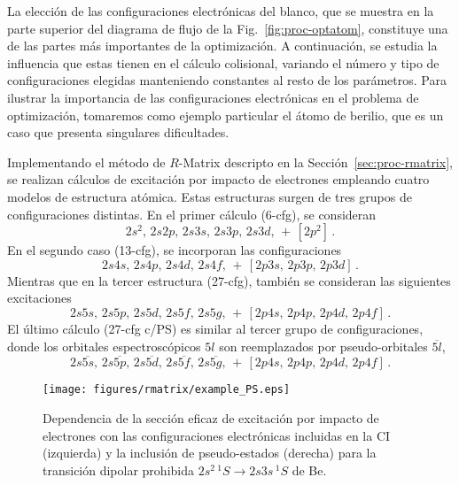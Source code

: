 La elección de las configuraciones electrónicas del blanco, que se 
muestra en la parte superior del diagrama de flujo de la 
Fig.~\ref{fig:proc-optatom}, constituye una de las partes más 
importantes de la optimización. A continuación, se estudia la influencia 
que estas tienen en el cálculo colisional, variando el número y tipo de 
configuraciones elegidas manteniendo constantes al resto de los 
parámetros. Para ilustrar la importancia de las configuraciones 
electrónicas en el problema de optimización, tomaremos como ejemplo 
particular el átomo de berilio, que es un caso que presenta singulares 
dificultades. 

Implementando el método de $R$-Matrix descripto en la 
Sección~\ref{sec:proc-rmatrix}, se realizan cálculos de excitación por 
impacto de electrones empleando cuatro modelos de estructura atómica. 
Estas estructuras surgen de tres grupos de configuraciones distintas. En 
el primer cálculo (6-cfg), se consideran  
\begin{equation}
2s^2,\,2s2p,\,2s3s,\,2s3p,\,2s3d,\,+\,
\left[2p^2\right]\,.
\label{eq:cfgA}
\end{equation} 
En el segundo caso (13-cfg), se incorporan las configuraciones 
\begin{equation}
2s4s,\,2s4p,\,2s4d,\,2s4f,\,+\,
\left[2p3s,\,2p3p,\,2p3d\right]\,.
\label{eq:cfgB}
\end{equation} 
Mientras que en la tercer estructura (27-cfg), también se consideran las 
siguientes excitaciones 
\begin{equation}
2s5s,\,2s5p,\,2s5d,\,2s5f,\,2s5g,\,+\,
\left[2p4s,\,2p4p,\,2p4d,\,2p4f\right]\,.
\label{eq:cfgC}
\end{equation} 
El último cálculo (27-cfg c/PS) es similar al tercer grupo de 
configuraciones, donde los orbitales espectroscópicos $5l$ son 
reemplazados por pseudo-orbitales $\overline{5l}$,
\begin{equation}
2s\overline{5s},\,2s\overline{5p},\,2s\overline{5d},\,2s\overline{5f},\,
2s\overline{5g},\,+\,
\left[2p4s,\,2p4p,\,2p4d,\,2p4f\right]\,.
\label{eq:cfgD}
\end{equation} 

\begin{figure}[t]
\centering
\texttt{[image: figures/rmatrix/example\_PS.eps]}
\caption[Dependencia de la sección eficaz de excitación con las 
configuraciones electrónicas y los pseudo-estados.]
{Dependencia de la sección eficaz de excitación por impacto de
electrones con las configuraciones electrónicas incluidas en la CI 
(izquierda) y la inclusión de pseudo-estados (derecha) para la transición 
dipolar prohibida $2s^2\,^1S \rightarrow 2s3s\,^1S$ de Be.}
\label{fig:dependencia-CI}
\end{figure}

